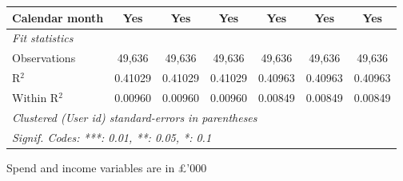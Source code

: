 \begin{table}[htbp]
\begin{threeparttable}[b]
\begin{tabular}{lcccccc}
         Calendar month            & Yes            & Yes            & Yes            & Yes            & Yes            & Yes\\  
         \midrule
         \emph{Fit statistics}\\
         Observations              & 49,636         & 49,636         & 49,636         & 49,636         & 49,636         & 49,636\\  
         R$^2$                     & 0.41029        & 0.41029        & 0.41029        & 0.40963        & 0.40963        & 0.40963\\  
         Within R$^2$              & 0.00960        & 0.00960        & 0.00960        & 0.00849        & 0.00849        & 0.00849\\  
         \midrule \midrule
         \multicolumn{7}{l}{\emph{Clustered (User id) standard-errors in parentheses}}\\
         \multicolumn{7}{l}{\emph{Signif. Codes: ***: 0.01, **: 0.05, *: 0.1}}\\
      \end{tabular}
      
      \begin{tablenotes}\footnotesize
         \item Spend and income variables are in £'000
      \end{tablenotes}
   \end{threeparttable}
\end{table}


